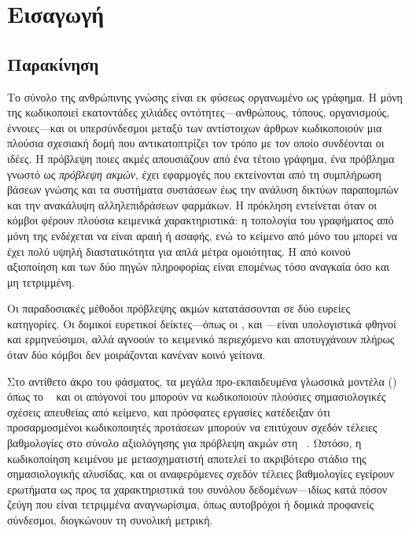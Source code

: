 

\chapter{Εισαγωγή}
\label{ch:introduction}


\section{Παρακίνηση}
\label{sec:motivation}

Το σύνολο της ανθρώπινης γνώσης είναι εκ φύσεως οργανωμένο ως γράφημα.
Η
 μόνη της κωδικοποιεί εκατοντάδες χιλιάδες οντότητες---ανθρώπους,
τόπους, οργανισμούς, έννοιες---και οι υπερσύνδεσμοι μεταξύ των αντίστοιχων άρθρων
κωδικοποιούν μια πλούσια σχεσιακή δομή που αντικατοπτρίζει τον τρόπο με τον οποίο
συνδέονται οι ιδέες.
Η πρόβλεψη ποιες ακμές απουσιάζουν από ένα τέτοιο γράφημα, ένα
πρόβλημα γνωστό ως \textit{πρόβλεψη ακμών}, έχει εφαρμογές που εκτείνονται από τη
συμπλήρωση βάσεων γνώσης και τα συστήματα συστάσεων έως την ανάλυση δικτύων
παραπομπών και την ανακάλυψη αλληλεπιδράσεων φαρμάκων.
Η πρόκληση εντείνεται όταν οι
κόμβοι φέρουν πλούσια κειμενικά χαρακτηριστικά: η τοπολογία του γραφήματος από μόνη της
ενδέχεται να είναι αραιή ή ασαφής, ενώ το κείμενο από μόνο του μπορεί να έχει πολύ
υψηλή διαστατικότητα για απλά μέτρα ομοιότητας.
Η από κοινού αξιοποίηση και των δύο
πηγών πληροφορίας είναι επομένως τόσο αναγκαία όσο και μη τετριμμένη.

Οι παραδοσιακές μέθοδοι πρόβλεψης ακμών κατατάσσονται σε δύο ευρείες κατηγορίες.
Οι
δομικοί ευρετικοί δείκτες---όπως οι ,  και
---είναι υπολογιστικά φθηνοί και ερμηνεύσιμοι, αλλά
αγνοούν το κειμενικό περιεχόμενο και αποτυγχάνουν πλήρως όταν δύο κόμβοι δεν
μοιράζονται κανέναν κοινό γείτονα.

Στο αντίθετο
άκρο του φάσματος, τα μεγάλα προ-εκπαιδευμένα γλωσσικά μοντέλα () όπως το
~\cite{devlin2019bert} και οι απόγονοί του μπορούν να κωδικοποιούν πλούσιες
σημασιολογικές σχέσεις απευθείας από κείμενο, και πρόσφατες εργασίες κατέδειξαν ότι
προσαρμοσμένοι κωδικοποιητές προτάσεων μπορούν να επιτύχουν σχεδόν τέλειες βαθμολογίες
στο σύνολο αξιολόγησης  για πρόβλεψη ακμών στη ~\cite{phan2023link,tran2023text}.
Ωστόσο, η κωδικοποίηση κειμένου με μετασχηματιστή αποτελεί το ακριβότερο στάδιο
της σημασιολογικής αλυσίδας, και οι αναφερόμενες σχεδόν τέλειες
βαθμολογίες εγείρουν ερωτήματα ως προς τα χαρακτηριστικά του συνόλου δεδομένων---ιδίως
κατά πόσον ζεύγη που είναι τετριμμένα αναγνωρίσιμα, όπως αυτοβρόχοι ή δομικά
προφανείς σύνδεσμοι, διογκώνουν τη συνολική μετρική.

